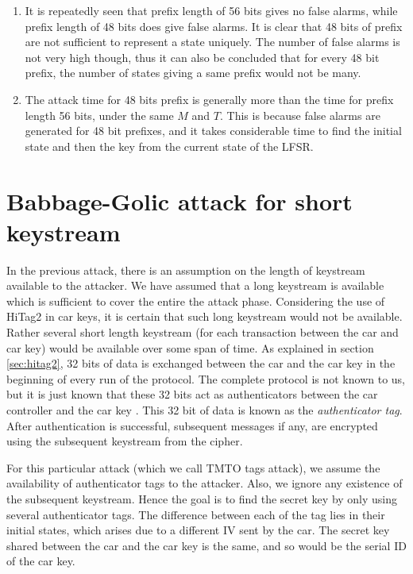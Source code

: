 \begin{enumerate}
\item It is repeatedly seen that prefix length of 56 bits gives no false alarms, while prefix length of 48 bits does give false alarms. It is clear that 48 bits of prefix are not sufficient to represent a state uniquely. The number of false alarms is not very high though, thus it can also be concluded that for every 48 bit prefix, the number of states giving a same prefix would not be many.
 
\item The attack time for 48 bits prefix is generally more than the time for prefix length 56 bits, under the same $M$ and $T$. This is because false alarms are generated for 48 bit prefixes, and it takes considerable time to find the initial state and then the key from the current state of the LFSR.

\end{enumerate}

\section{Babbage-Golic attack for short keystream}
\label{sec:bg-tags-attack}

In the previous attack, there is an assumption on the length of keystream available to the attacker. We have assumed that a long keystream is available which is sufficient to cover the entire the attack phase. Considering the use of HiTag2 in car keys, it is certain that such long keystream would not be available. Rather several short length keystream (for each transaction between the car and car key) would be available over some span of time. As explained in section \ref{sec:hitag2}, 32 bits of data is exchanged between the car and the car key in the beginning of every run of the protocol. The complete protocol is not known to us, but it is just known that these 32 bits act as authenticators between the car controller and the car key \cite{email-ruptor} \cite{hitag2-code}. This 32 bit of data is known as the \emph{authenticator tag}. After authentication is successful, subsequent messages if any, are encrypted using the subsequent keystream from the cipher.

For this particular attack (which we call TMTO tags attack), we assume the availability of authenticator tags to the attacker. Also, we ignore any existence of the subsequent keystream. Hence the goal is to find the secret key by only using several authenticator tags. The difference between each of the tag lies in their initial states, which arises due to a different IV sent by the car. The secret key shared between the car and the car key is the same, and so would be the serial ID of the car key.

